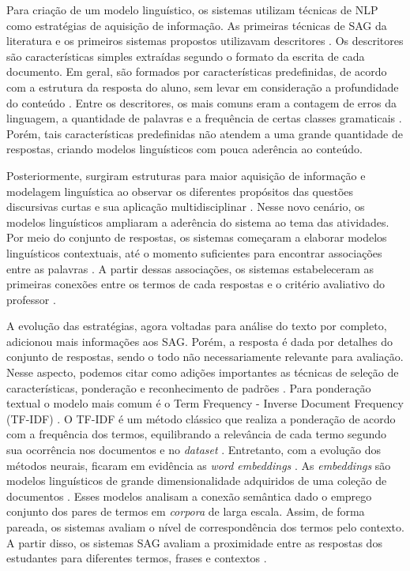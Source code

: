 Para criação de um modelo linguístico, os sistemas utilizam técnicas de NLP como estratégias de aquisição de informação. As primeiras técnicas de SAG da literatura e os primeiros sistemas propostos utilizavam descritores \cite{galhardi2018a}. Os descritores são características simples extraídas segundo o formato da escrita de cada documento. Em geral, são formados por características predefinidas, de acordo com a estrutura da resposta do aluno, sem levar em consideração a profundidade do conteúdo \cite{mohler2009}. Entre os descritores, os mais comuns eram a contagem de erros da linguagem, a quantidade de palavras e a frequência de certas classes gramaticais \cite{ galhardi2018b, riordan2019}. Porém, tais características predefinidas não atendem a uma grande quantidade de respostas, criando modelos linguísticos com pouca aderência ao conteúdo.

Posteriormente, surgiram estruturas para maior aquisição de informação e modelagem linguística ao observar os diferentes propósitos das questões discursivas curtas e sua aplicação multidisciplinar \cite{saha2018, kumar2019}. Nesse novo cenário, os modelos linguísticos ampliaram a aderência do sistema ao tema das atividades. Por meio do conjunto de respostas, os sistemas começaram a elaborar modelos linguísticos contextuais, até o momento suficientes para encontrar associações entre as palavras \cite{tan2020}. A partir dessas associações, os sistemas estabeleceram as primeiras conexões entre os termos de cada respostas e o critério avaliativo do professor \cite{sahu2020}.

A evolução das estratégias, agora voltadas para análise do texto por completo, adicionou mais informações aos SAG. Porém, a resposta é dada por detalhes do conjunto de respostas, sendo o todo não necessariamente relevante para avaliação. Nesse aspecto, podemos citar como adições importantes as técnicas de seleção de características, ponderação e reconhecimento de padrões \cite{banjade2016}. Para ponderação textual o modelo mais comum é o Term Frequency - Inverse Document Frequency (TF-IDF) \cite{baeza2011}. O TF-IDF é um método clássico que realiza a ponderação de acordo com a frequência dos termos, equilibrando a relevância de cada termo segundo sua ocorrência nos documentos e no \textit{dataset} \cite{sultan2016}. Entretanto, com a evolução dos métodos neurais, ficaram em evidência as \textit{word embeddings} \cite{jurafsky2009}. As \textit{embeddings} são modelos linguísticos de grande dimensionalidade adquiridos de uma coleção de documentos \cite{goldberg2017}. Esses modelos analisam a conexão semântica dado o emprego conjunto dos pares de termos em \textit{corpora} de larga escala. Assim, de forma pareada, os sistemas avaliam o nível de correspondência dos termos pelo contexto. A partir disso, os sistemas SAG avaliam a proximidade entre as respostas dos estudantes para diferentes termos, frases e contextos \cite{sung2019b, ghavidel2020, galhardi2020, haller2022}.

